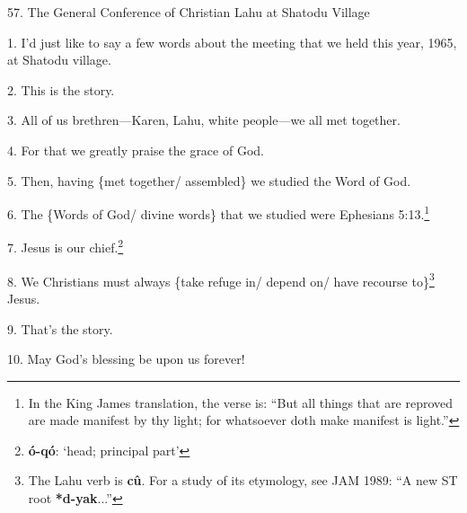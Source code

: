 
57. The General Conference of Christian Lahu at Shatodu Village

1. I'd just like to say a few words  about the meeting that we held this year,
1965, at Shatodu village.

2. This is the story.

3. All of us brethren---Karen, Lahu, white people---we all met together.

4. For that we greatly praise the grace of God.

5. Then, having \{met together/ assembled\} we studied the Word of God.

6. The \{Words of God/ divine words\} that we studied were Ephesians 5:13.\footnote{In the King James translation, the verse is: ``But all things that are reproved are made manifest by thy light; for whatsoever doth make manifest is light.''}

7. Jesus is our chief.\footnote{\textbf{ó-qó}: `head; principal part'}

8. We Christians must always \{take refuge in/ depend on/ have recourse to\}\footnote{The Lahu verb is \textbf{cû}. For a study of its etymology, see JAM 1989: ``A new ST root \textbf{*d-yak}...''}
Jesus.

9. That's the story.

10. May God's blessing be upon us forever!

